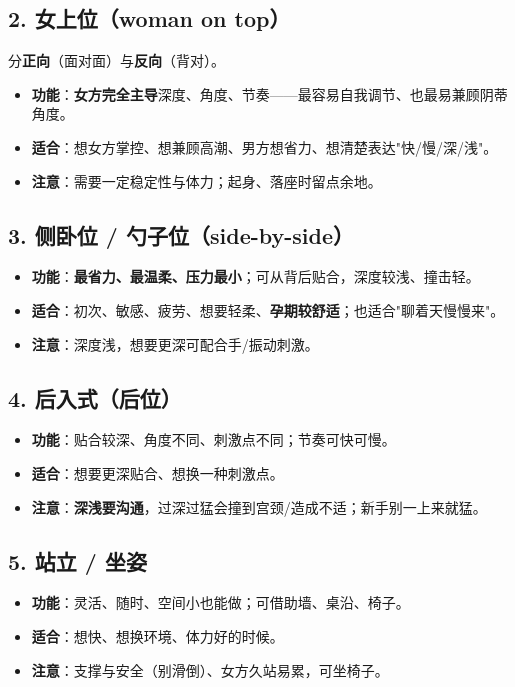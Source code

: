 \subsection*{2. 女上位（woman on top）}

分\textbf{正向}（面对面）与\textbf{反向}（背对）。
\begin{itemize}[leftmargin=2em,itemsep=0.3em]
  \item \textbf{功能}：\textbf{女方完全主导}深度、角度、节奏——最容易自我调节、也最易兼顾阴蒂角度。
  \item \textbf{适合}：想女方掌控、想兼顾高潮、男方想省力、想清楚表达"快/慢/深/浅"。
  \item \textbf{注意}：需要一定稳定性与体力；起身、落座时留点余地。
\end{itemize}

\subsection*{3. 侧卧位 / 勺子位（side-by-side）}
\begin{itemize}[leftmargin=2em,itemsep=0.3em]
  \item \textbf{功能}：\textbf{最省力、最温柔、压力最小}；可从背后贴合，深度较浅、撞击轻。
  \item \textbf{适合}：初次、敏感、疲劳、想要轻柔、\textbf{孕期较舒适}；也适合"聊着天慢慢来"。
  \item \textbf{注意}：深度浅，想要更深可配合手/振动刺激。
\end{itemize}

\subsection*{4. 后入式（后位）}
\begin{itemize}[leftmargin=2em,itemsep=0.3em]
  \item \textbf{功能}：贴合较深、角度不同、刺激点不同；节奏可快可慢。
  \item \textbf{适合}：想要更深贴合、想换一种刺激点。
  \item \textbf{注意}：\textbf{深浅要沟通}，过深过猛会撞到宫颈/造成不适；新手别一上来就猛。
\end{itemize}

\subsection*{5. 站立 / 坐姿}
\begin{itemize}[leftmargin=2em,itemsep=0.3em]
  \item \textbf{功能}：灵活、随时、空间小也能做；可借助墙、桌沿、椅子。
  \item \textbf{适合}：想快、想换环境、体力好的时候。
  \item \textbf{注意}：支撑与安全（别滑倒）、女方久站易累，可坐椅子。
\end{itemize}

